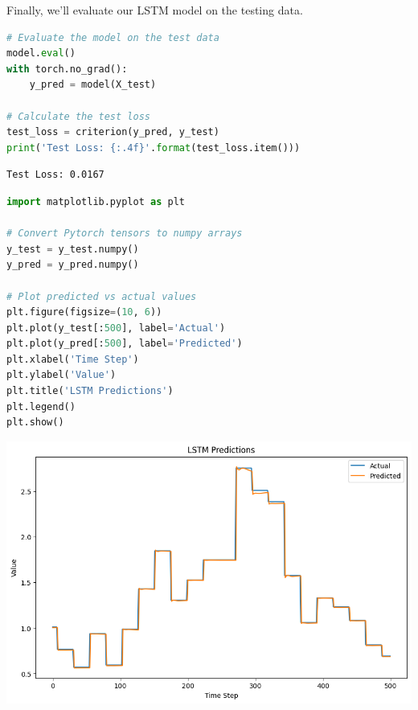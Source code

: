 Finally, we'll evaluate our LSTM model on the testing data.

\begin{lstlisting}[language=Python]
# Evaluate the model on the test data
model.eval()
with torch.no_grad():
    y_pred = model(X_test)

# Calculate the test loss
test_loss = criterion(y_pred, y_test)
print('Test Loss: {:.4f}'.format(test_loss.item()))
\end{lstlisting}

\begin{lstlisting}
Test Loss: 0.0167
\end{lstlisting}

\begin{lstlisting}[language=Python]
import matplotlib.pyplot as plt

# Convert Pytorch tensors to numpy arrays
y_test = y_test.numpy()
y_pred = y_pred.numpy()

# Plot predicted vs actual values
plt.figure(figsize=(10, 6))
plt.plot(y_test[:500], label='Actual')
plt.plot(y_pred[:500], label='Predicted')
plt.xlabel('Time Step')
plt.ylabel('Value')
plt.title('LSTM Predictions')
plt.legend()
plt.show()
\end{lstlisting}

\includegraphics{img/rnn/lstm/output_16_0_pred_temp.png}

